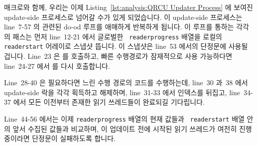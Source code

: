  매크로와 함께, 우리는 이제
Listing~\ref{lst:analysis:QRCU Updater Process} 에 보여진 update-side
프로세스로 넘어갈 수가 있게 되었습니다.
이 update-side 프로세스는 line~7-57 의 관련된 do-od 루프를 애매하게 반복하게
됩니다.
이 루프를 통하는 각각의 패스는 먼저 line~12-21 에서 글로벌한 {\tt
readerprogress} 배열을 로컬의 {\tt readerstart} 어레이로 스냅샷 뜹니다.
이 스냅샷은 line~53 에서의 단정문에 사용될 겁니다.
Line~23 은  를 호출하고, 빠른 수행경로가 잠재적으로 사용
가능하다면 line~24-27 에서  를 다시 호출합니다.
\iffalse

\begin{lineref}[ln:formal:promela:qrcu:updater]
With the \co{sum_unordered} macro in place, we can now proceed
to the update-side process shown in
Listing~\ref{lst:formal:QRCU Updater Process}.
The update-side process repeats indefinitely, with the corresponding
\co{do-od} loop ranging over lines~\lnref{do}-\lnref{od}.
Each pass through the loop first snapshots the global \co{readerprogress}
array into the local \co{readerstart} array on
lines~\lnref{atm1:b}-\lnref{atm1:e}.
This snapshot will be used for the assertion on line~\lnref{assert}.
Line~\lnref{sum_unord} invokes \co{sum_unordered}, and then
lines~\lnref{reinvoke:b}-\lnref{reinvoke:e}
re-invoke \co{sum_unordered} if the fastpath is potentially
usable.
\fi

Line~28-40 은 필요하다면 느린 수행 경로의 코드를 수행하는데, line~30 과~38 에서
update-side 락을 각각 획득하고 해제하며, line~31-33 에서 인덱스를 뒤집고,
line~34-37 에서 모든 이전부터 존재한 읽기 쓰레드들이 완료되길 기다립니다.

Line~44-56 에서는 이제 {\tt readerprogress} 배열의 현재 값들과 {\tt
readerstart} 배열 안의 앞서 수집된 값들과 비교하며, 이 업데이트 전에 시작된
읽기 쓰레드가 여전히 진행중이라면 단정문이 실패하도록 합니다.
\iffalse

Lines~\lnref{slow:b}-\lnref{slow:e} execute the slowpath code if need be, with
lines~\lnref{acq} and~\lnref{rel} acquiring and releasing the update-side lock,
lines~\lnref{flip_idx:b}-\lnref{flip_idx:e} flipping the index, and
lines~\lnref{wait:b}-\lnref{wait:e} waiting for
all pre-existing readers to complete.

Lines~\lnref{atm2:b}-\lnref{atm2:e} then compare the current values
in the \co{readerprogress}
array to those collected in the \co{readerstart} array,
forcing an assertion failure should any readers that started before
this update still be in progress.
\end{lineref}
\fi

